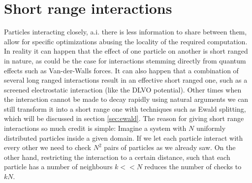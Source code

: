 \documentclass[ twoside,openright,titlepage,numbers=noenddot,%
headinclude,footinclude,cleardoublepage=empty,abstract=on,
BCOR=5mm,paper=a4,fontsize=11pt, dvipsnames
]{scrreprt}
\begin{document}
\section{Short range interactions}
Particles interacting closely, a.i. there is less information to share between them, allow for specific optimizations abusing the locality of the required computation.
In reality it can happen that the effect of one particle on another is short ranged in nature, as could be the case for interactions stemming directly from quantum effects such as Van-der-Walls forces. It can also happen that a combination of several long ranged interactions result in an effective short ranged one, such as a screened electrostatic interaction (like the DLVO potential). Other times when the interaction cannot be made to decay rapidly using natural arguments we can still transform it into a short range one with techniques such as Ewald splitting, which will be discussed in section \ref{sec:ewald}.
The reason for giving short range interactions so much credit is simple: Imagine a system with $N$ uniformly distributed particles inside a given domain. If we let each particle interact with every other we need to check $N^2$ pairs of particles as we already saw. On the other hand, restricting the interaction to a certain distance, such that each particle has a number of neighbours $k<<N$ reduces the number of checks to $kN$.
\end{document}
